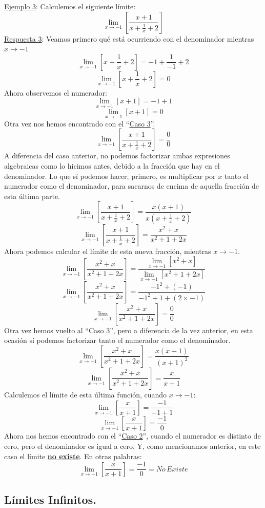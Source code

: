 \documentclass[12pt]{article}
\begin{document}
\underline{Ejemplo 3}: Calculemos el siguiente límite:
\[\lim_{x \to -1} \left[\frac{x + 1}{x + \frac{1}{x} + 2}\right]\]
\underline{Respuesta 3}: Veamos primero qué está ocurriendo con el denominador mientras $x \to -1$
\[\lim_{x \to -1} \left[x + \frac{1}{x} + 2\right] = -1 + \frac{1}{-1} + 2\]
\[\lim_{x \to -1} \left[x + \frac{1}{x} + 2\right] = 0\]
Ahora observemos el numerador:
\[\lim_{x \to -1} [x + 1] = -1 + 1\]
\[\lim_{x \to -1} [x + 1] = 0\]
Otra vez nos hemos encontrado con el ``\underline{Caso 3}''.
\[\lim_{x \to -1} \left[\frac{x + 1}{x + \frac{1}{x} + 2}\right] = \frac{0}{0}\]
A diferencia del caso anterior, no podemos factorizar ambas expresiones algebraicas como lo hicimos antes, debido a la fracción que hay en el denominador. Lo que sí podemos hacer, primero, es multiplicar por $x$ tanto el numerador como el denominador, para sacarnos de encima de aquella fracción de esta última parte.
\[\lim_{x \to -1} \left[\frac{x + 1}{x + \frac{1}{x} + 2}\right] = \frac{x(x + 1)}{x(x + \frac{1}{x} + 2)}\]
\[\lim_{x \to -1} \left[\frac{x + 1}{x + \frac{1}{x} + 2}\right] = \frac{x^{2} + x}{x^{2} + 1 + 2x}\]
Ahora podemos calcular el límite de esta nueva fracción, mientras $x \to -1$.
\[\lim_{x \to -1} \left[\frac{x^{2} + x}{x^{2} + 1 + 2x}\right] = \frac{\lim_{x \to -1} [x^{2} + x]}{\lim_{x \to -1} [x^{2} + 1 + 2x]}\]
\[\lim_{x \to -1} \left[\frac{x^{2} + x}{x^{2} + 1 + 2x}\right] = \frac{-1^{2} + (-1)}{-1^{2} + 1 + (2 \times -1)}\]
\[\lim_{x \to -1} \left[\frac{x^{2} + x}{x^{2} + 1 + 2x}\right] = \frac{0}{0}\]
Otra vez hemos vuelto al ``Caso 3'', pero a diferencia de la vez anterior, en esta ocasión sí podemos factorizar tanto el numerador como el denominador.
\[\lim_{x \to -1} \left[\frac{x^{2} + x}{x^{2} + 1 + 2x}\right] = \frac{x(x + 1)}{(x + 1)^{2}}\]
\[\lim_{x \to -1} \left[\frac{x^{2} + x}{x^{2} + 1 + 2x}\right] = \frac{x}{x + 1}\]
Calculemos el límite de esta última función, cuando $x \to -1$:
\[\lim_{x \to -1}\left[\frac{x}{x + 1} \right] = \frac{-1}{-1 + 1}\]
\[\lim_{x \to -1}\left[\frac{x}{x + 1} \right] = \frac{-1}{0}\]
Ahora nos hemos encontrado con el ``\underline{Caso 2}'', cuando el numerador es distinto de cero, pero el denominador es igual a cero. Y, como mencionamos anterior, en este caso el límite \textbf{\underline{no existe}}. En otras palabras:
\[\lim_{x \to -1}\left[\frac{x}{x + 1} \right] = \frac{-1}{0} = No \, Existe\]

\newpage

\subsection{Límites Infinitos.}
\end{document}

